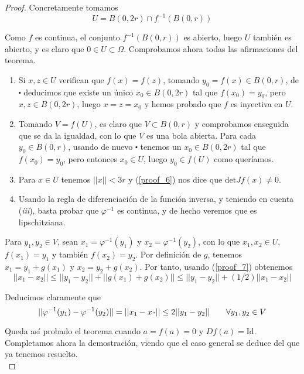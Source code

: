 \documentclass[a4paper, 12pt]{article}
\begin{document}
\begin{enumerate}[label=\textbf{\arabic*}.]
\begin{proof}
Concretamente tomamos
\[
	U = B(0,2r) \cap f^{-1} (B(0,r))
\]

Como \(f\) es continua, el conjunto \(f^{-1} (B(0,r))\) es abierto, luego \(U\) también es abierto, y es claro que \(0 \in U \subset \Omega\). Comprobamos ahora todas las afirmaciones del teorema.

\begin{enumerate}[label=(\textit{\roman*})]
\item Si \(x,z \in U\) verifican que \(f(x) = f(z)\), tomando \(y_0 = f(x) \in B(0,r)\), de \(\centerdot\) deducimos que existe un único \(x_0 \in B(0,2r)\) tal que \(f(x_0) = y_0\), pero \(x,z \in B(0,2r)\), luego \(x = z = x_0\) y hemos probado que \(f\) es inyectiva en \(U\).

\item Tomando \(V = f(U)\), es claro que \(V \subset B(0,r)\) y comprobamos enseguida que se da la igualdad, con lo que \(V\) es una bola abierta. Para cada \(y_0 \in B(0,r)\), usando de nuevo \(\centerdot\) tenemos un \(x_0 \in B(0,2r)\) tal que \(f(x_0) = y_0\), pero entonces \(x_0 \in U\), luego \(y_0 \in f(U)\) como queríamos.

\item Para \(x \in U\) tenemos \(||x|| < 3r\) y (\ref{proof_6}) nos dice que \(\text{det}Jf(x) \neq 0\).

\item Usando la regla de diferenciación de la función inversa, y teniendo en cuenta (\textit{iii}), basta probar que \(\varphi^{-1}\) es continua, y de hecho veremos que es lipschitziana.
\end{enumerate}

Para \(y_1, y_2 \in V\), sean \(x_1 = \varphi^{-1} (y_1)\) y \(x_2 = \varphi^{-1} (y_2)\), con lo que \(x_1, x_2 \in U\), \(f(x_1) = y_1\) y también \(f(x_2) = y_2\). Por definición de \(g\), tenemos \(x_1 = y_1 + g(x_1)\) y \(x_2 = y_2 + g(x_2)\). Por tanto, usando (\ref{proof_7}) obtenemos
\[
	||x_1 - x_2|| \leq ||y_1 - y_2|| + ||g(x_1) + g(x_2)|| \leq ||y_1 - y_2|| + (1/2) ||x_1 - x_2||
\] 

Deducimos claramente que 
\[
	|| \varphi^{-1} (y_1) - \varphi^{-1} (y_2)|| = || x_1 - x_"|| \leq 2 ||y_1 - y_2|| \qquad \forall y_1, y_2 \in V
\]

Queda así probado el teorema cuando \(a = f(a) = 0\) y \(Df(a) = \text{Id}\). Completamos ahora la demostración, viendo que el caso general se deduce del que ya tenemos resuelto. \\


\end{proof}
\end{enumerate}
\end{document}
